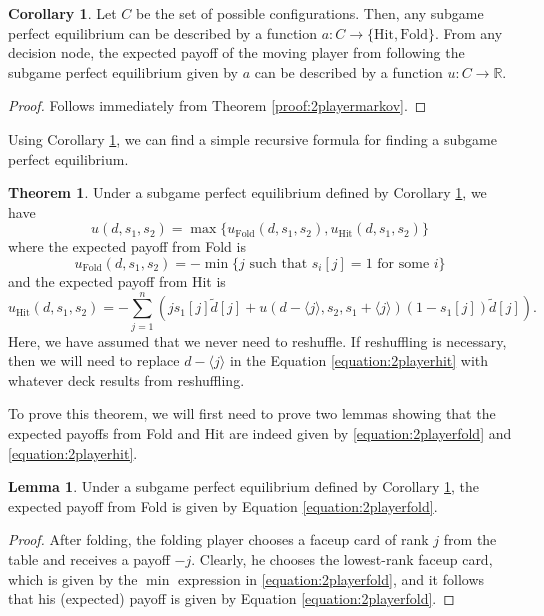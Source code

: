 \documentclass{article}
\theoremstyle{definition}
\newcounter{a}
\newtheorem{theorem}[a]{Theorem}
\newtheorem{corollary}[a]{Corollary}
\newtheorem{lemma}[a]{Lemma}
\begin{document}
\begin{corollary}
Let $C$ be the set of possible configurations. Then, any subgame perfect equilibrium can be described by a function $a:C \to \{\text{Hit},\text{Fold}\}$. From any decision node, the expected payoff of the moving player from following the subgame perfect equilibrium given by $a$ can be described by a function $u:C \to \mathbb{R}$. 
\begin{proof}
Follows immediately from Theorem \ref{proof:2playermarkov}.
\end{proof}
\label{proof:2playerform}
\end{corollary}

Using Corollary \ref{proof:2playerform}, we can find a simple recursive formula for finding a subgame perfect equilibrium.

\begin{theorem}
Under a subgame perfect equilibrium defined by Corollary \ref{proof:2playerform}, we have
\begin{equation}
u(d,s_1, s_2) = \max\{ u_{\text{Fold}} (d,s_1, s_2), u_{{\text{Hit}}} (d,s_1, s_2) \}
\label{equation:2playerrecurrence}
\end{equation}
where the expected payoff from Fold is
\begin{equation}
u_{\text{Fold}} (d,s_1, s_2) = -\min\{j \text{ such that } s_i [j] = 1 \text{ for some } i\}
\label{equation:2playerfold}
\end{equation}
and the expected payoff from Hit is
\begin{equation}
u_{{\text{Hit}}} (d,s_1, s_2) = - \sum_{j=1}^n \left( j s_1 [j] \tilde{d}[j] + u(d - \langle j \rangle, s_2, s_1 + \langle j \rangle) (1 - s_1 [j]) \tilde{d} [j] \right).
\label{equation:2playerhit}
\end{equation}
Here, we have assumed that we never need to reshuffle. If reshuffling is necessary, then we will need to replace $d - \langle j \rangle$ in the Equation \ref{equation:2playerhit} with whatever deck results from reshuffling.
\label{proof:2playerrecurrence}
\end{theorem}

To prove this theorem, we will first need to prove two lemmas showing that the expected payoffs from Fold and Hit are indeed given by \ref{equation:2playerfold} and \ref{equation:2playerhit}.

\begin{lemma}
Under a subgame perfect equilibrium defined by Corollary \ref{proof:2playerform}, the expected payoff from Fold is given by Equation \ref{equation:2playerfold}.
\begin{proof}
After folding, the folding player chooses a faceup card of rank $j$ from the table and receives a payoff $-j$. Clearly, he chooses the lowest-rank faceup card, which is given by the $\min$ expression in \ref{equation:2playerfold}, and it follows that his (expected) payoff is given by Equation \ref{equation:2playerfold}.
\end{proof}
\label{proof:2playerfold}
\end{lemma}
\end{document}
